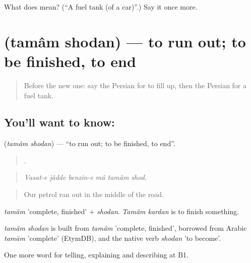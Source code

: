 \begin{tcolorbox}[breakable,colback=teal!4,colframe=teal!35!black,title={Before you move on}]
What does  mean? (\textquotedblleft{}A fuel tank (of a car)\textquotedblright{}.) Say it once more.
\end{tcolorbox}
\section[\texorpdfstring{\fa{تمام} \fa{شدن} (tamâm shodan)}{تمام شدن (tamâm shodan)}]{  (tamâm shodan) — to run out; to be finished, to end}

\label{lesson:FA-C423-tamam-shodan}



\begin{quote}
Before the new one: say the Persian for to fill up, then the Persian for a fuel tank.
\end{quote}

\subsection*{You'll want to know:  }
\textbf{ } (\emph{tamâm shodan}) — \textquotedblleft{}to run out; to be finished, to end\textquotedblright{}.

\begin{quote}
     .
\end{quote}

\begin{quote}
\emph{Vasat-e jâdde benzin-e mâ tamâm shod.}
\end{quote}

\begin{quote}
Our petrol ran out in the middle of the road.
\end{quote}

\emph{tamâm} 'complete, finished' + \emph{shodan}. \emph{Tamâm kardan} is to finish something.

\begin{cousinweb}
\emph{tamâm shodan} is built from \emph{tamâm} 'complete, finished', borrowed from Arabic \emph{tamām} 'complete' (EtymDB), and the native verb \emph{shodan} 'to become'.
\end{cousinweb}

\begin{grammarlens}[title={What you've built}]
One more word for telling, explaining and describing at B1.
\end{grammarlens}

